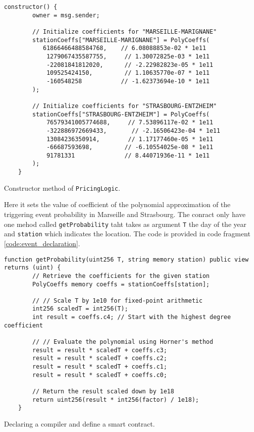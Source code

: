 \documentclass[10pt]{article}
\begin{document}
\begin{codefragment}[!ht]
\begin{lstlisting}[language=Solidity]
    constructor() {
        owner = msg.sender;

        // Initialize coefficients for "MARSEILLE-MARIGNANE"
        stationCoeffs["MARSEILLE-MARIGNANE"] = PolyCoeffs(
           61866466488584768,    // 6.08088853e-02 * 1e11
            1279067435587755,     // 1.30072825e-03 * 1e11
            -22081841812020,      // -2.22982823e-05 * 1e11
            109525424150,         // 1.10635770e-07 * 1e11
            -160548258           // -1.62373694e-10 * 1e11
        );

        // Initialize coefficients for "STRASBOURG-ENTZHEIM"
        stationCoeffs["STRASBOURG-ENTZHEIM"] = PolyCoeffs(
            76579341005774688,     // 7.53896117e-02 * 1e11
            -322886972669433,       // -2.16506423e-04 * 1e11
            13084236350914,        // 1.17177460e-05 * 1e11
            -66687593698,         // -6.10554025e-08 * 1e11
            91781331              // 8.44071936e-11 * 1e11
        );
    }

\end{lstlisting}
    \caption{Constructor method of \texttt{PricingLogic}.}
    \label{code:constructor_PricingLogic}
\end{codefragment}

Here it sets the value of coefficient of the polynomial approximation of the triggering event probability in Marseille and Strasbourg.  The conract only have one mehod called \texttt{getProbability} taht takes as argument \texttt{T} the day of the year and \texttt{station} which indicates the location. The code is provided in code fragment \ref{code:event_declaration}.
\begin{codefragment}[!ht]
\begin{lstlisting}[language=Solidity]
    function getProbability(uint256 T, string memory station) public view returns (uint) {
        // Retrieve the coefficients for the given station
        PolyCoeffs memory coeffs = stationCoeffs[station];

        // // Scale T by 1e10 for fixed-point arithmetic
        int256 scaledT = int256(T);
        int result = coeffs.c4; // Start with the highest degree coefficient

        // // Evaluate the polynomial using Horner's method
        result = result * scaledT + coeffs.c3;
        result = result * scaledT + coeffs.c2;
        result = result * scaledT + coeffs.c1;
        result = result * scaledT + coeffs.c0;

        // Return the result scaled down by 1e18
        return uint256(result * int256(factor) / 1e18);
    }

\end{lstlisting}
    \caption{Declaring a compiler and define a smart contract.}
    \label{code:getProbability_method}
\end{codefragment}
\end{document}
